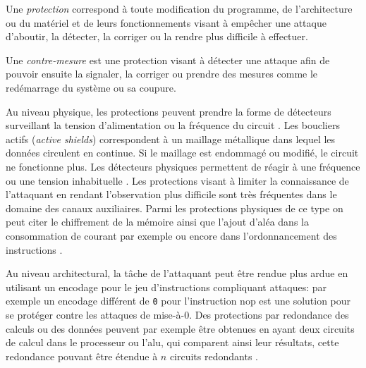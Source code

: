         \begin{defi}
            Une \textit{protection} correspond à toute modification du programme, de l'architecture ou du matériel et de leurs fonctionnements visant à empêcher une attaque d'aboutir, la détecter, la corriger ou la rendre plus difficile à effectuer.
        \end{defi}
        
        \begin{defi}
            Une \textit{contre-mesure} est une protection visant à détecter une attaque afin de pouvoir ensuite la signaler, la corriger ou prendre des mesures comme le redémarrage du système ou sa coupure.
        \end{defi}
        
        Au niveau physique, les protections peuvent prendre la forme de détecteurs surveillant la tension d'alimentation ou la fréquence du circuit \cite{Zussa/DATE14}. 
        Les boucliers actifs (\textit{active shields}) \cite{BarEl/IEEE06} correspondent à un maillage métallique dans lequel les données circulent en continue. Si le maillage est endommagé ou modifié, le circuit ne fonctionne plus.
        Les détecteurs physiques permettent de réagir à une fréquence ou une tension inhabituelle \cite{BarEl/IEEE06}. 
        Les protections visant à limiter la connaissance de l'attaquant en rendant l'observation plus difficile sont très fréquentes dans le domaine des canaux auxiliaires. Parmi les protections physiques de ce type on peut citer le chiffrement de la mémoire \cite{Barenghi/IEEE2012} ainsi que l'ajout d'aléa dans la consommation de courant par exemple \cite{Moro/Phd14} ou encore dans l'ordonnancement des instructions \cite{Wittman/RSA08}.
        
        Au niveau architectural, la tâche de l'attaquant peut être rendue plus ardue en utilisant un encodage pour le jeu d'instructions compliquant attaques: par exemple un encodage différent de \texttt{0} pour l'instruction \gls{nop} est une solution pour se protéger contre les attaques de mise-à-0.
        Des protections par redondance des calculs ou des données peuvent par exemple être obtenues en ayant deux circuits de calcul dans le processeur ou l'\gls{alu}, qui comparent ainsi leur résultats, cette redondance pouvant être étendue à $n$ circuits redondants \cite{BarEl/IEEE06}.  
        
